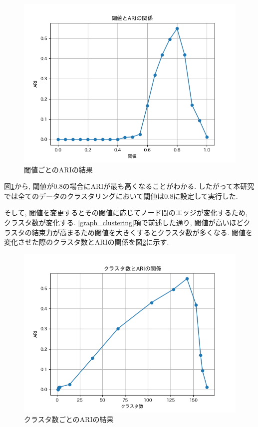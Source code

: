 \begin{figure}[H]
  \centering
  \includegraphics[scale=0.8]
    {contents/images/cw_graph.png}
  \caption{閾値ごとのARIの結果\label{fig:cw_graph}}
\end{figure}
図\ref{fig:cw_graph}から, 閾値が0.8の場合にARIが最も高くなることがわかる. したがって本研究では全てのデータのクラスタリングにおいて閾値は0.8に設定して実行した.

そして, 閾値を変更するとその閾値に応じてノード間のエッジが変化するため, クラスタ数が変化する. \ref{graph_clustering}項で前述した通り, 閾値が高いほどクラスタの結束力が高まるため閾値を大きくするとクラスタ数が多くなる. 閾値を変化させた際のクラスタ数とARIの関係を図\ref{fig:cw_cluster_graph}に示す.

\begin{figure}[H]
  \centering
  \includegraphics[scale=0.8]
    {contents/images/cw_cluster_graph.png}
  \caption{クラスタ数ごとのARIの結果\label{fig:cw_cluster_graph}}
\end{figure}

